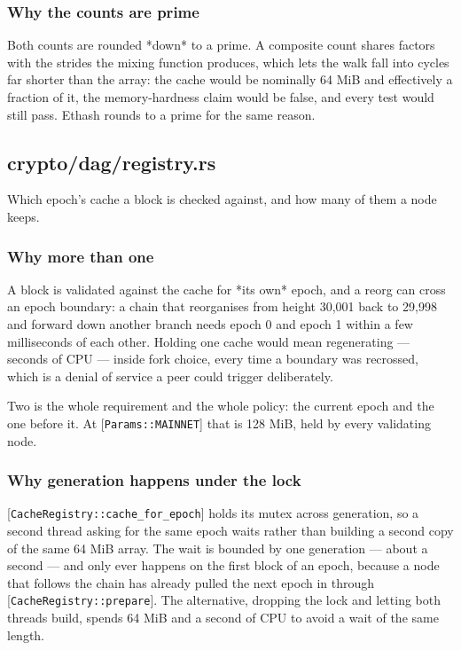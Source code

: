 \documentclass[11pt,a4paper]{article}
\begin{document}
\subsubsection{Why the counts are prime}

Both counts are rounded *down* to a prime. A composite count shares factors
with the strides the mixing function produces, which lets the walk fall into
cycles far shorter than the array: the cache would be nominally 64 MiB and
effectively a fraction of it, the memory-hardness claim would be false, and
every test would still pass. Ethash rounds to a prime for the same reason.

\subsection{crypto/dag/registry.rs}
Which epoch's cache a block is checked against, and how many of them a node
keeps.

\subsubsection{Why more than one}

A block is validated against the cache for *its own* epoch, and a reorg can
cross an epoch boundary: a chain that reorganises from height 30,001 back to
29,998 and forward down another branch needs epoch 0 and epoch 1 within a
few milliseconds of each other. Holding one cache would mean regenerating —
seconds of CPU — inside fork choice, every time a boundary was recrossed,
which is a denial of service a peer could trigger deliberately.

Two is the whole requirement and the whole policy: the current epoch and the
one before it. At [\texttt{Params::MAINNET}] that is 128 MiB, held by every
validating node.

\subsubsection{Why generation happens under the lock}

[\texttt{CacheRegistry::cache\_for\_epoch}] holds its mutex across generation, so a
second thread asking for the same epoch waits rather than building a second
copy of the same 64 MiB array. The wait is bounded by one generation — about
a second — and only ever happens on the first block of an epoch, because a
node that follows the chain has already pulled the next epoch in through
[\texttt{CacheRegistry::prepare}]. The alternative, dropping the lock and letting
both threads build, spends 64 MiB and a second of CPU to avoid a wait of the
same length.
\end{document}
